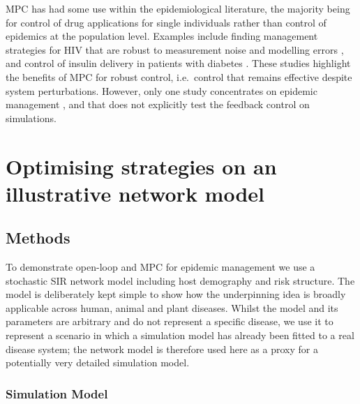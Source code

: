 MPC has had some use within the epidemiological literature, the majority being for control of drug applications for single individuals rather than control of epidemics at the population level. Examples include finding management strategies for HIV that are robust to measurement noise and modelling errors \citep{zurakowski_model_2006, david_receding_2011}, and control of insulin delivery in patients with diabetes \citep{hovorka_nonlinear_2004}. These studies highlight the benefits of MPC for robust control, i.e.\ control that remains effective despite system perturbations. However, only one study concentrates on epidemic management \citep{selley_dynamic_2015}, and that does not explicitly test the feedback control on simulations.

\section{Optimising strategies on an illustrative network model}

\subsection*{Methods}

To demonstrate open-loop and MPC for epidemic management we use a stochastic SIR network model including host demography and risk structure. The model is deliberately kept simple to show how the underpinning idea is broadly applicable across human, animal and plant diseases. Whilst the model and its parameters are arbitrary and do not represent a specific disease, we use it to represent a scenario in which a simulation model has already been fitted to a real disease system; the network model is therefore used here as a proxy for a potentially very detailed simulation model.

\subsubsection*{Simulation Model}

